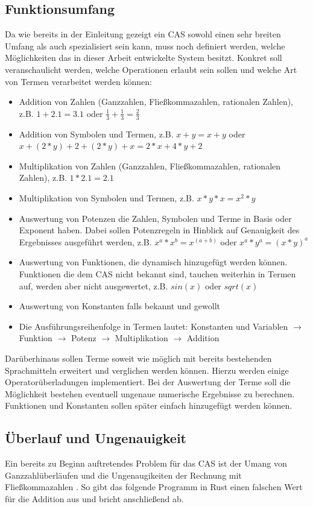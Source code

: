 \documentclass[11pt,a4paper, ngerman]{article}
\begin{document}
\subsection{Funktionsumfang}
Da wie bereits in der Einleitung gezeigt ein CAS sowohl einen sehr breiten Umfang als auch spezialisiert sein kann, muss noch definiert werden, welche Möglichkeiten das in dieser Arbeit entwickelte System besitzt. Konkret soll veranschaulicht werden, welche Operationen erlaubt sein sollen und welche Art von Termen verarbeitet werden können:
\begin{itemize}
    \item Addition von Zahlen (Ganzzahlen, Fließkommazahlen, rationalen Zahlen), z.B. $1+2.1 = 3.1$ oder $\frac{1}{3} + \frac{1}{3} = \frac{2}{3}$
    \item Addition von Symbolen und Termen, z.B. $x+y = x+y$ oder $x+(2*y)+2+(2*y)+x = 2*x+4*y+2$
    \item Multiplikation von Zahlen (Ganzzahlen, Fließkommazahlen, rationalen Zahlen), z.B. $1*2.1 = 2.1$
    \item Multiplikation von Symbolen und Termen, z.B. $x*y*x = x^2*y$
    \item Auswertung von Potenzen die Zahlen, Symbolen und Terme in Basis oder Exponent haben. Dabei sollen Potenzregeln in Hinblick auf Genauigkeit des Ergebnisses ausgeführt werden, z.B. $x^a*x^b=x^{(a+b)}$ oder $x^a*y^a = (x*y)^a$
    \item Auswertung von Funktionen, die dynamisch hinzugefügt werden können. Funktionen die dem CAS nicht bekannt sind, tauchen weiterhin in Termen auf, werden aber nicht ausgewertet, z.B. $sin(x)$ oder $sqrt(x)$
    \item Auswertung von Konstanten falls bekannt und gewollt
    \item Die Ausführungsreihenfolge in Termen lautet: Konstanten und Variablen $\rightarrow$ Funktion $\rightarrow$ Potenz $\rightarrow$ Multiplikation $\rightarrow$ Addition
\end{itemize}

Darüberhinaus sollen Terme soweit wie möglich mit bereits bestehenden Sprachmitteln erweitert und verglichen werden können. Hierzu werden einige Operatorüberladungen implementiert. Bei der Auswertung der Terme soll die Möglichkeit bestehen eventuell ungenaue numerische Ergebnisse zu berechnen. Funktionen und Konstanten sollen später einfach hinzugefügt werden können.

\subsection{Überlauf und Ungenauigkeit}
Ein bereits zu Beginn auftretendes Problem für das CAS ist der Umang von Ganzzahlüberläufen und die Ungenaugikeiten der Rechnung mit Fließkommazahlen \cite{IEEE754}. So gibt das folgende Programm in Rust einen falschen Wert für die Addition aus und bricht anschließend ab.
\end{document}
